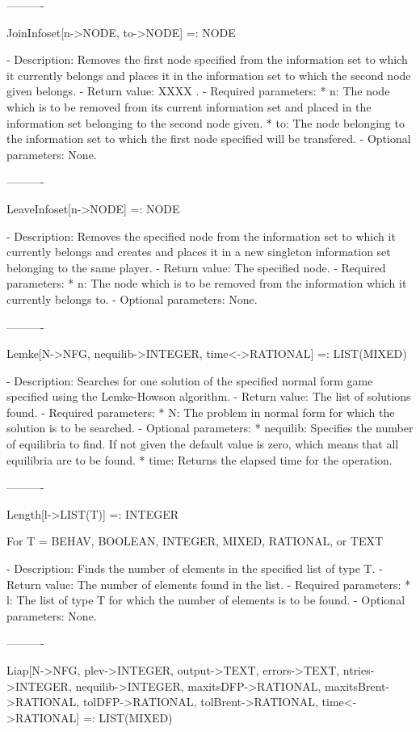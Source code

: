 ----------

JoinInfoset[n->NODE, to->NODE] =: NODE

   -	Description:  Removes the first node specified from the information set
	to which it currently belongs and places it in the information set to
	which the second node given belongs.
   -	Return value:  XXXX .
   -	Required parameters:
	  *  n:  The node which is to be removed from its current information
		set and placed in the information set belonging to the second
		node given.
	  *  to:  The node belonging to the information set to which the first
		node specified will be transfered.
   -	Optional parameters:  None.

----------

LeaveInfoset[n->NODE] =: NODE

   -	Description:  Removes the specified node from the information set to
	which it currently belongs and creates and places it in a new singleton
	information set belonging to the same player.
   -	Return value:  The specified node.
   -	Required parameters:
	  *  n:  The node which is to be removed from the information which it
		currently belongs to.
   -	Optional parameters:  None.

----------

Lemke[N->NFG, {nequilib->INTEGER}, {time<->RATIONAL}] =: LIST(MIXED)

   -	Description:  Searches for one solution of the specified normal form 
	game specified using the Lemke-Howson algorithm.  
   -	Return value:  The list of solutions found.
   -	Required parameters:
	  *  N:  The problem in normal form for which the solution is to be 
		searched.
   -	Optional parameters: 
	  *  nequilib:  Specifies the number of equilibria to find.  If not
		given the default value is zero, which means that all 
		equilibria are to be found.
	  *  time:  Returns the elapsed time for the operation.

----------

Length[l->LIST(T)] =: INTEGER

	For T = BEHAV, BOOLEAN, INTEGER, MIXED, RATIONAL, or TEXT

   -	Description:  Finds the number of elements in the specified list of 
	type T.
   -	Return value:  The number of elements found in the list.
   -	Required parameters:
	  *  l:  The list of type T for which the number of elements is to be 
		found.
   -	Optional parameters:  None.

----------

Liap[N->NFG, {plev->INTEGER}, {output->TEXT}, {errors->TEXT}, 
	{ntries->INTEGER}, {nequilib->INTEGER}, {maxitsDFP->RATIONAL},
	{maxitsBrent->RATIONAL}, {tolDFP->RATIONAL}, {tolBrent->RATIONAL},
	{time<->RATIONAL}] =: LIST(MIXED)

